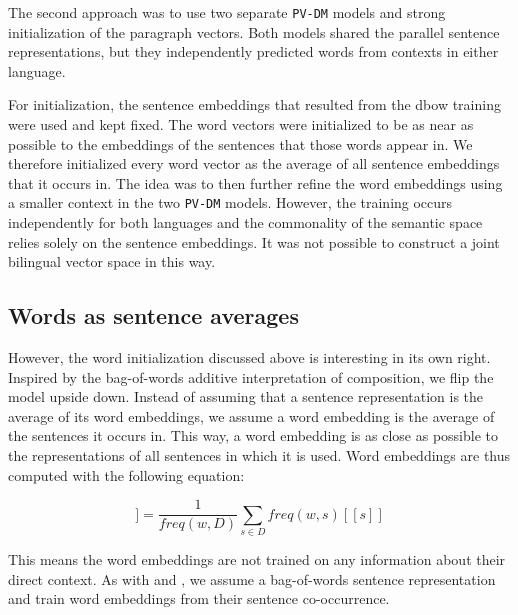 The second approach was to use two separate \texttt{PV-DM} models and strong initialization of the paragraph vectors.
Both models shared the parallel sentence representations, but they independently predicted words from contexts in either language.

For initialization, the sentence embeddings that resulted from the dbow training were used and kept fixed.
The word vectors were initialized to be as near as possible to the embeddings of the sentences that those words appear in.
We therefore initialized every word vector as the average of all sentence embeddings that it occurs in.
The idea was to then further refine the word embeddings using a smaller context in the two \texttt{PV-DM} models.
However, the training occurs independently for both languages and the commonality of the semantic space relies solely on the sentence embeddings.
It was not possible to construct a joint bilingual vector space in this way.


% 



\subsection{Words as sentence averages}

However, the word initialization discussed above is interesting in its own right.
Inspired by the bag-of-words additive interpretation of composition, we flip the model upside down.
Instead of assuming that a sentence representation is the average of its word embeddings, we assume a word embedding is the average of the sentences it occurs in.
This way, a word embedding is as close as possible to the representations of all sentences in which it is used.
Word embeddings are thus computed with the following equation:

\begin{equation*}
[\![ w ]\!] =\frac{1}{freq(w,D)}\sum_{s\in D}freq(w,s) [\![ s ]\!]
\end{equation*}

This means the word embeddings are not trained on any information about their direct context.
As with \cite{hermann2013multilingual} and \cite{SarathChandar2014autoencoder}, we assume a bag-of-words sentence representation and train word embeddings from their sentence co-occurrence.

